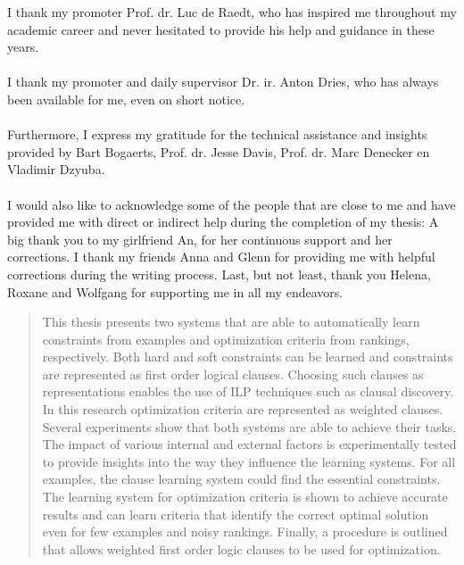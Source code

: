 \documentclass[master=cws,masteroption=ai,english]{kulemt}
\theoremstyle{definition}
\begin{document}
\begin{preface}
I thank my promoter Prof. dr. Luc de Raedt, who has inspired me throughout my academic career and never hesitated to provide his help and guidance in these years.
\\\\
I thank my promoter and daily supervisor Dr. ir. Anton Dries, who has always been available for me, even on short notice.
\\\\
Furthermore, I express my gratitude for the technical assistance and insights provided by Bart Bogaerts, Prof. dr. Jesse Davis, Prof. dr. Marc Denecker en Vladimir Dzyuba.
\\\\
I would also like to acknowledge some of the people that are close to me and have provided me with direct or indirect help during the completion of my thesis:
A big thank you to my girlfriend An, for her continuous support and her corrections.
I thank my friends Anna and Glenn for providing me with helpful corrections during the writing process.
Last, but not least, thank you Helena, Roxane and Wolfgang for supporting me in all my endeavors.
\end{preface}

\tableofcontents*

\begin{abstract}
This thesis presents two systems that are able to automatically learn constraints from examples and optimization criteria from rankings, respectively.
Both hard and soft constraints can be learned and constraints are represented as first order logical clauses.
Choosing such clauses as representations enables the use of ILP techniques such as clausal discovery.
In this research optimization criteria are represented as weighted clauses.
Several experiments show that both systems are able to achieve their tasks.
The impact of various internal and external factors is experimentally tested to provide insights into the way they influence the learning systems.
For all examples, the clause learning system could find the essential constraints.
The learning system for optimization criteria is shown to achieve accurate results and can learn criteria that identify the correct optimal solution even for few examples and noisy rankings.
Finally, a procedure is outlined that allows weighted first order logic clauses to be used for optimization.
\end{abstract}
\end{document}

